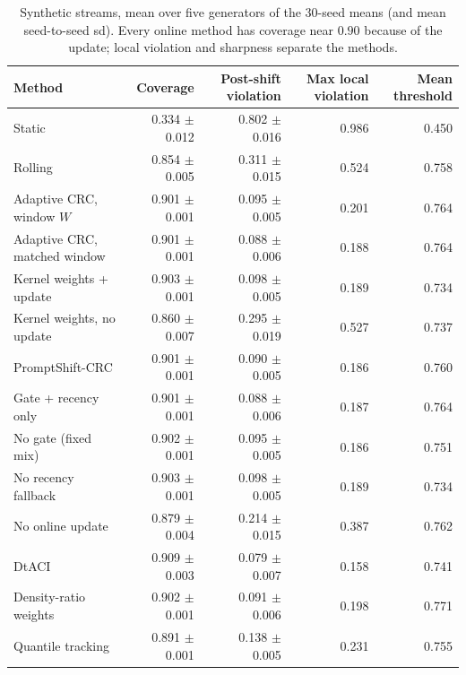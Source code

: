 \begin{table}[t]
\centering
\small
\caption{Synthetic streams, mean over five generators of the 30-seed means (and mean seed-to-seed sd). Every online method has coverage near $0.90$ because of the update; local violation and sharpness separate the methods.}
\label{tab:synthetic}
\begin{tabular}{lrrrr}
\toprule
Method & Coverage & Post-shift violation & Max local violation & Mean threshold \\
\midrule
Static & 0.334 $\pm$ 0.012 & 0.802 $\pm$ 0.016 & 0.986 & 0.450 \\
Rolling & 0.854 $\pm$ 0.005 & 0.311 $\pm$ 0.015 & 0.524 & 0.758 \\
Adaptive CRC, window $W$ & 0.901 $\pm$ 0.001 & 0.095 $\pm$ 0.005 & 0.201 & 0.764 \\
Adaptive CRC, matched window & 0.901 $\pm$ 0.001 & 0.088 $\pm$ 0.006 & 0.188 & 0.764 \\
Kernel weights + update & 0.903 $\pm$ 0.001 & 0.098 $\pm$ 0.005 & 0.189 & 0.734 \\
Kernel weights, no update & 0.860 $\pm$ 0.007 & 0.295 $\pm$ 0.019 & 0.527 & 0.737 \\
PromptShift-CRC & 0.901 $\pm$ 0.001 & 0.090 $\pm$ 0.005 & 0.186 & 0.760 \\
Gate + recency only & 0.901 $\pm$ 0.001 & 0.088 $\pm$ 0.006 & 0.187 & 0.764 \\
No gate (fixed mix) & 0.902 $\pm$ 0.001 & 0.095 $\pm$ 0.005 & 0.186 & 0.751 \\
No recency fallback & 0.903 $\pm$ 0.001 & 0.098 $\pm$ 0.005 & 0.189 & 0.734 \\
No online update & 0.879 $\pm$ 0.004 & 0.214 $\pm$ 0.015 & 0.387 & 0.762 \\
DtACI & 0.909 $\pm$ 0.003 & 0.079 $\pm$ 0.007 & 0.158 & 0.741 \\
Density-ratio weights & 0.902 $\pm$ 0.001 & 0.091 $\pm$ 0.006 & 0.198 & 0.771 \\
Quantile tracking & 0.891 $\pm$ 0.001 & 0.138 $\pm$ 0.005 & 0.231 & 0.755 \\
\bottomrule
\end{tabular}
\par{}
\end{table}

